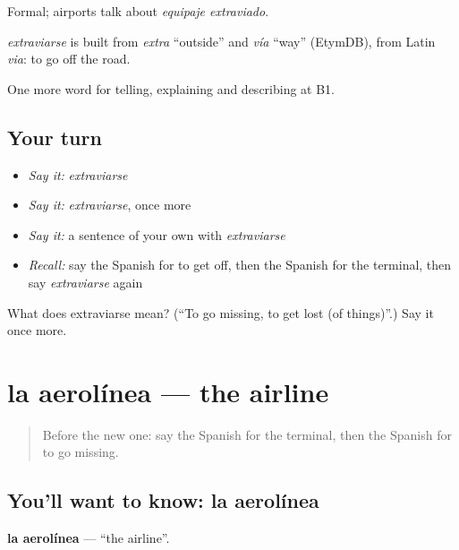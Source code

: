 Formal; airports talk about \emph{equipaje extraviado}.

\begin{cousinweb}
\emph{extraviarse} is built from \emph{extra} \textquotedblleft{}outside\textquotedblright{} and \emph{vía} \textquotedblleft{}way\textquotedblright{} (EtymDB), from Latin \emph{via}: to go off the road.
\end{cousinweb}

\begin{grammarlens}[title={What you've built}]
One more word for telling, explaining and describing at B1.
\end{grammarlens}

\subsection*{Your turn}
\begin{itemize}
\raggedright
  \item \emph{Say it:} \emph{extraviarse}
  \item \emph{Say it:} \emph{extraviarse}, once more
  \item \emph{Say it:} a sentence of your own with \emph{extraviarse}
  \item \emph{Recall:} say the Spanish for to get off, then the Spanish for the terminal, then say \emph{extraviarse} again
\end{itemize}

\begin{tcolorbox}[breakable,colback=teal!4,colframe=teal!35!black,title={Before you move on}]
What does extraviarse mean? (\textquotedblleft{}To go missing, to get lost (of things)\textquotedblright{}.) Say it once more.
\end{tcolorbox}
\section[la aerolínea]{la aerolínea — the airline}

\label{lesson:ES-C652-aerolinea}



\begin{quote}
Before the new one: say the Spanish for the terminal, then the Spanish for to go missing.
\end{quote}

\subsection*{You'll want to know: la aerolínea}
\textbf{la aerolínea} — \textquotedblleft{}the airline\textquotedblright{}.


